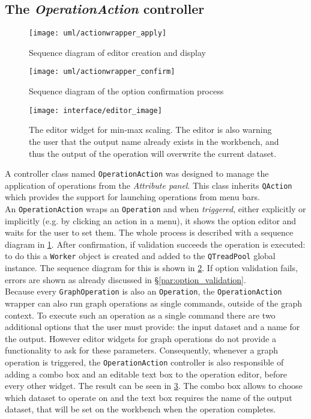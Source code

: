 \subsection{The \textit{OperationAction} controller}
\begin{figure}
	\centering
	\texttt{[image: uml/actionwrapper\_apply]}
	\caption{Sequence diagram of editor creation and display}
	\label{fig:actionwrapper_apply_seq}
\end{figure}
\begin{figure}
	\centering
	\texttt{[image: uml/actionwrapper\_confirm]}
	\caption{Sequence diagram of the option confirmation process}
	\label{fig:actionwrapper_confirm_seq}
\end{figure}
\begin{figure}
	\centering
	\texttt{[image: interface/editor\_image]}
	\caption[The editor widget for min-max scaling]{The editor widget for min-max scaling. The editor is also warning the user that the output name already exists in the workbench, and thus the output of the operation will overwrite the current dataset.}
	\label{fig:editor_widget}
\end{figure}
A controller class named \texttt{OperationAction} was designed to manage the application of operations from the \textit{Attribute panel}. This class inherits \texttt{QAction} which provides the support for launching operations from menu bars.\\ 
An \texttt{OperationAction} wraps an \texttt{Operation} and when \textit{triggered}, either explicitly or implicitly (e.g. by clicking an action in a menu), it shows the option editor and waits for the user to set them. The whole process is described with a sequence diagram in \cref{fig:actionwrapper_apply_seq}.  After confirmation, if validation succeeds the operation is executed: to do this a \texttt{Worker} object is created and added to the \texttt{QTreadPool} global instance. The sequence diagram for this is shown in \cref{fig:actionwrapper_confirm_seq}.
If option validation fails, errors are shown as already discussed in §\ref{par:option_validation}.\\
Because every \texttt{GraphOperation} is also an \texttt{Operation}, the \texttt{OperationAction} wrapper can also run graph operations as single commands, outside of the graph context. To execute such an operation as a single command there are two additional options that the user must provide: the input dataset and a name for the output. However editor widgets for graph operations do not provide a functionality to ask for these parameters. Consequently, whenever a graph operation is triggered, the \texttt{OperationAction} controller is also responsible of adding a combo box and an editable text box to the operation editor, before every other widget. The result can be seen in \cref{fig:editor_widget}. The combo box allows to choose which dataset to operate on and the text box requires the name of the output dataset, that will be set on the workbench when the operation completes.

